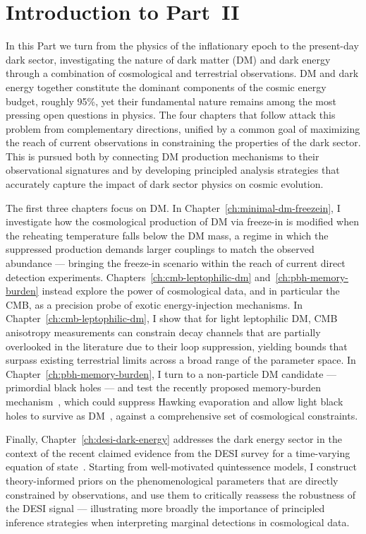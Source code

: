 \chapter*{Introduction to Part~II}
\label{ch:part2-intro}

In this Part we turn from the physics of the inflationary epoch to the present-day dark sector, investigating the nature of dark matter (DM) and dark energy through a combination of cosmological and terrestrial observations.   DM and dark energy together constitute the dominant components of the cosmic energy budget, roughly 95\%, yet their fundamental nature remains among the most pressing open questions in physics. The four chapters that follow attack this problem from complementary directions, unified by a common goal of maximizing the reach of current observations in constraining the properties of the dark sector. This is pursued both by connecting DM production mechanisms to their observational signatures and by developing principled analysis strategies that accurately capture the impact of dark sector physics on cosmic evolution.

The first three chapters focus on DM. In Chapter~\ref{ch:minimal-dm-freezein}, I investigate how the cosmological production of DM via freeze-in is modified when the reheating temperature falls below the DM mass, a regime in which the suppressed production demands larger couplings to match the observed abundance --- bringing the freeze-in scenario within the reach of current direct detection experiments. Chapters~\ref{ch:cmb-leptophilic-dm} and~\ref{ch:pbh-memory-burden} instead explore the power of cosmological data, and in particular the CMB, as a precision probe of exotic energy-injection mechanisms. In Chapter~\ref{ch:cmb-leptophilic-dm}, I show that for light leptophilic DM, CMB anisotropy measurements can constrain decay channels that are partially overlooked in the literature due to their loop suppression, yielding bounds that surpass existing terrestrial limits across a broad range of the parameter space. In Chapter~\ref{ch:pbh-memory-burden}, I turn to a non-particle DM candidate --- primordial black holes --- and test the recently proposed memory-burden mechanism~\cite{Dvali:2018xpy, Dvali:2018ytn, Dvali:2020wft}, which could suppress Hawking evaporation and allow light black holes to survive as DM~\cite{Alexandre:2024nuo, Dvali:2024hsb, Thoss:2024hsr}, against a comprehensive set of cosmological constraints.

Finally, Chapter~\ref{ch:desi-dark-energy} addresses the dark energy sector in the context of the recent claimed evidence from the DESI survey for a time-varying equation of state~\cite{DESI:2024mwx, DESI:2025zgx}. Starting from well-motivated quintessence models, I construct theory-informed priors on the phenomenological parameters that are directly constrained by observations, and use them to critically reassess the robustness of the DESI signal --- illustrating more broadly the importance of principled inference strategies when interpreting marginal detections in cosmological data.

